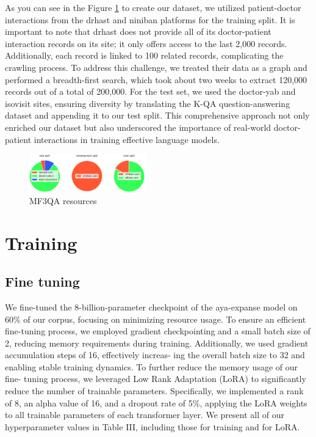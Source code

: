 \documentclass[conference]{IEEEtran}
\begin{document}
	As you can see in the Figure
	\ref{fig2}
	to create our dataset, we utilized patient-doctor interactions from the drhast and niniban platforms for the training split. It is important to note that drhast does not provide all of its doctor-patient interaction records on its site; it only offers access to the last 2,000 records. Additionally, each record is linked to 100 related records, complicating the crawling process. To address this challenge, we treated their data as a graph and performed a breadth-first search, which took about two weeks to extract 120,000 records out of a total of 200,000. For the test set, we used the doctor-yab and isovisit sites, ensuring diversity by translating the K-QA question-answering dataset
	\cite{b27}
	and appending it to our test split. This comprehensive approach not only enriched our dataset but also underscored the importance of real-world doctor-patient interactions in training effective language models.
	
	\begin{figure}[htbp]
		\centerline{\includegraphics[width=0.45\textwidth]{fig2.png}}
		\caption{MF3QA resources}
		\label{fig2}
	\end{figure}
	
	\section{Training}
	\subsection{Fine tuning}
	We fine-tuned the 8-billion-parameter checkpoint of the aya-expanse model on 60\% of our corpus, focusing on minimizing
	resource usage. To ensure an efficient fine-tuning process, we
	employed gradient checkpointing and a small batch size of 2,
	reducing memory requirements during training. Additionally,
	we used gradient accumulation steps of 16, effectively increas-
	ing the overall batch size to 32 and enabling stable training
	dynamics. To further reduce the memory usage of our fine-
	tuning process, we leveraged Low Rank Adaptation (LoRA)
	\cite{b28}
	to significantly reduce the number of trainable parameters.
	Specifically, we implemented a rank of 8, an alpha value of
	16, and a dropout rate of 5\%, applying the LoRA weights to
	all trainable parameters of each transformer layer. We present
	all of our hyperparameter values in Table III, including those
	for training and for LoRA.
	
\end{document}
